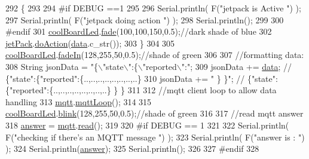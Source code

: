 \begin{DoxyCode}
292     \{
293     
294 \textcolor{preprocessor}{    #if DEBUG ==1}
295 
296         Serial.println( F(\textcolor{stringliteral}{"jetpack is Active "}) );
297         Serial.println( F(\textcolor{stringliteral}{"jetpack doing action "}) );
298         Serial.println();
299 
300 \textcolor{preprocessor}{    #endif}
301         \hyperlink{classCoolBoard_a1b1d3c684a5baa56b08486e192fd8e97}{coolBoardLed}.\hyperlink{classCoolBoardLed_af1cacbaa88db8bcf6042c1083ba41155}{fade}(100,100,150,0.5);\textcolor{comment}{//dark shade of blue     }
302         \hyperlink{classCoolBoard_a30b1357881b01ccbec676856a91e48e9}{jetPack}.\hyperlink{classJetpack_a9e703197093094b963f9ad57817495b8}{doAction}(\hyperlink{classCoolBoard_a427fb753dd8575bdf821c70a5c63d695}{data}.c\_str());
303     \}
304     
305     \hyperlink{classCoolBoard_a1b1d3c684a5baa56b08486e192fd8e97}{coolBoardLed}.\hyperlink{classCoolBoardLed_ab778f5e7bed0ab74e3906d82110493c3}{fadeIn}(128,255,50,0.5);\textcolor{comment}{//shade of green}
306 
307     \textcolor{comment}{//formatting data:}
308     String jsonData = \textcolor{stringliteral}{"\{\(\backslash\)"state\(\backslash\)":\{\(\backslash\)"reported\(\backslash\)":"};
309     jsonData += \hyperlink{classCoolBoard_a427fb753dd8575bdf821c70a5c63d695}{data}; \textcolor{comment}{// \{"state":\{"reported":\{..,..,..,..,..,..,..,..\}}
310     jsonData += \textcolor{stringliteral}{" \} \}"}; \textcolor{comment}{// \{"state":\{"reported":\{..,..,..,..,..,..,..,..\}  \} \}}
311     
312     \textcolor{comment}{//mqtt client loop to allow data handling}
313     \hyperlink{classCoolBoard_a2399f44d7c23c1149a335cb3b46d90f1}{mqtt}.\hyperlink{classCoolMQTT_aa5eaae967b562b62cbcf2b8d81f6e5d5}{mqttLoop}();
314 
315     \hyperlink{classCoolBoard_a1b1d3c684a5baa56b08486e192fd8e97}{coolBoardLed}.\hyperlink{classCoolBoardLed_a96e1ea13003eee34c9dbcef340404426}{blink}(128,255,50,0.5);\textcolor{comment}{//shade of green    }
316 
317     \textcolor{comment}{//read mqtt answer}
318     \hyperlink{classCoolBoard_a7b835fafd449e5282f7f91d787a2dc15}{answer} = \hyperlink{classCoolBoard_a2399f44d7c23c1149a335cb3b46d90f1}{mqtt}.\hyperlink{classCoolMQTT_ae3c18f6ae9723746d32765f1c8f176ca}{read}();
319 
320 \textcolor{preprocessor}{#if DEBUG == 1 }
321 
322     Serial.println( F(\textcolor{stringliteral}{"checking if there's an MQTT message "})  );
323     Serial.println( F(\textcolor{stringliteral}{"answer is : "}) );    
324     Serial.println(\hyperlink{classCoolBoard_a7b835fafd449e5282f7f91d787a2dc15}{answer});   
325     Serial.println();
326 
327 \textcolor{preprocessor}{#endif  }
328 

\end{DoxyCode}
